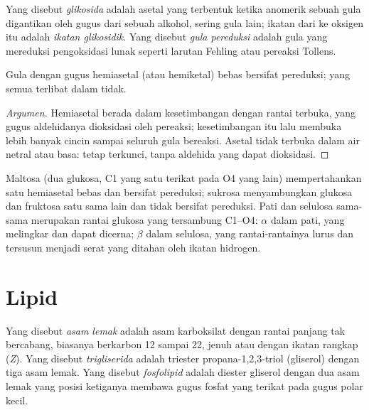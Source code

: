 \begin{definition}[Glikosida]\label{def:b2:biomolecules:glycoside}
Yang disebut \emph{glikosida} adalah asetal yang terbentuk
ketika  anomerik sebuah gula digantikan oleh gugus  dari
sebuah alkohol, sering gula lain; ikatan dari  ke oksigen itu
adalah \emph{ikatan glikosidik}. Yang disebut
\emph{gula pereduksi}
adalah gula yang mereduksi pengoksidasi lunak seperti larutan Fehling atau
pereaksi Tollens.
\end{definition}

\begin{proposition}\label{prop:b2:biomolecules:reducing}
Gula dengan gugus hemiasetal (atau hemiketal) bebas bersifat pereduksi;
 yang semua  terlibat dalam 
tidak.
\end{proposition}

\begin{proof}[Argumen]
Hemiasetal berada dalam kesetimbangan dengan rantai terbuka, yang gugus
aldehidanya dioksidasi oleh pereaksi; kesetimbangan itu lalu membuka lebih
banyak cincin sampai seluruh gula bereaksi. Asetal tidak terbuka dalam air
netral atau basa:  tetap terkunci, tanpa aldehida yang
dapat dioksidasi.
\end{proof}

Maltosa (dua glukosa, C1 yang satu terikat pada O4 yang lain) mempertahankan
satu hemiasetal bebas dan bersifat pereduksi; sukrosa menyambungkan  glukosa dan fruktosa satu sama lain dan tidak bersifat pereduksi.
Pati dan selulosa sama-sama merupakan rantai glukosa yang tersambung C1--O4:
$\alpha$ dalam pati, yang melingkar dan dapat dicerna;
$\beta$ dalam selulosa, yang rantai-rantainya lurus dan tersusun menjadi
serat yang ditahan oleh ikatan hidrogen.

\section{Lipid}

\begin{definition}[Lipid]\label{def:b2:biomolecules:lipid}
Yang disebut \emph{asam lemak} adalah asam karboksilat
dengan rantai panjang tak bercabang, biasanya berkarbon 12 sampai
22, jenuh atau dengan ikatan rangkap (\textit{Z}). Yang disebut
\emph{trigliserida} adalah triester
propana-1,2,3-triol (gliserol) dengan tiga asam lemak. Yang disebut
\emph{fosfolipid} adalah diester gliserol dengan dua asam
lemak yang posisi ketiganya membawa gugus fosfat yang terikat pada gugus
polar kecil.
\end{definition}

